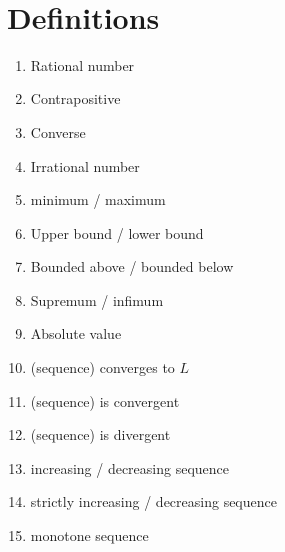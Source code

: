 \documentclass[12pt]{amsart}
\begin{document}

\

\section*{Definitions}

\begin{enumerate}
	\item Rational number
	\item Contrapositive
	\item Converse
	\item Irrational number
	\item minimum / maximum
	\item Upper bound / lower bound
	\item Bounded above / bounded below
	\item Supremum / infimum

	\item Absolute value
	\item (sequence) converges to $L$

	\item (sequence) is convergent
	\item (sequence) is divergent

	\item increasing / decreasing sequence
	\item strictly increasing / decreasing sequence
	\item monotone sequence
		\begin{comment}
	\item diverges to $\infty$ or $-\infty$				
	\item Subsequence
	


	\item Limit of a function

	\item Continuous at a point
	\item Continuous on an open interval
	\item Continuous on a closed interval
	
	\item Differentiable
	\item Derivative (at a point)
	\item Derivative (function)
		\item Increasing/decreasing function
\end{comment}
\end{enumerate}
\end{document}
